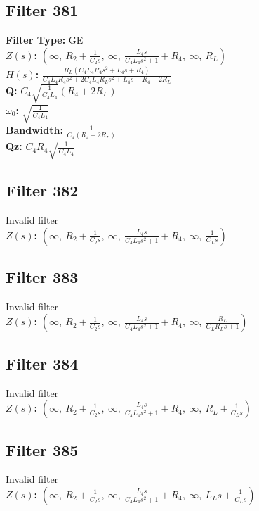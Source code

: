 \documentclass{article}
\begin{document}
\subsection*{Filter 381}
\textbf{Filter Type:} GE \\ 
\textbf{$Z(s)$:} $\left( \infty, \  R_{2} + \frac{1}{C_{2} s}, \  \infty, \  \frac{L_{4} s}{C_{4} L_{4} s^{2} + 1} + R_{4}, \  \infty, \  R_{L}\right)$ \\ 
\textbf{$H(s)$:} $\frac{R_{L} \left(C_{4} L_{4} R_{4} s^{2} + L_{4} s + R_{4}\right)}{C_{4} L_{4} R_{4} s^{2} + 2 C_{4} L_{4} R_{L} s^{2} + L_{4} s + R_{4} + 2 R_{L}}$ \\ 
\textbf{Q:} $C_{4} \sqrt{\frac{1}{C_{4} L_{4}}} \left(R_{4} + 2 R_{L}\right)$ \\ 
\textbf{$\omega_0$:} $\sqrt{\frac{1}{C_{4} L_{4}}}$ \\ 
\textbf{Bandwidth:} $\frac{1}{C_{4} \left(R_{4} + 2 R_{L}\right)}$ \\ 
\textbf{Qz:} $C_{4} R_{4} \sqrt{\frac{1}{C_{4} L_{4}}}$ \\ 
\subsection*{Filter 382}
Invalid filter \\ 
\textbf{$Z(s)$:} $\left( \infty, \  R_{2} + \frac{1}{C_{2} s}, \  \infty, \  \frac{L_{4} s}{C_{4} L_{4} s^{2} + 1} + R_{4}, \  \infty, \  \frac{1}{C_{L} s}\right)$ \\ 
\subsection*{Filter 383}
Invalid filter \\ 
\textbf{$Z(s)$:} $\left( \infty, \  R_{2} + \frac{1}{C_{2} s}, \  \infty, \  \frac{L_{4} s}{C_{4} L_{4} s^{2} + 1} + R_{4}, \  \infty, \  \frac{R_{L}}{C_{L} R_{L} s + 1}\right)$ \\ 
\subsection*{Filter 384}
Invalid filter \\ 
\textbf{$Z(s)$:} $\left( \infty, \  R_{2} + \frac{1}{C_{2} s}, \  \infty, \  \frac{L_{4} s}{C_{4} L_{4} s^{2} + 1} + R_{4}, \  \infty, \  R_{L} + \frac{1}{C_{L} s}\right)$ \\ 
\subsection*{Filter 385}
Invalid filter \\ 
\textbf{$Z(s)$:} $\left( \infty, \  R_{2} + \frac{1}{C_{2} s}, \  \infty, \  \frac{L_{4} s}{C_{4} L_{4} s^{2} + 1} + R_{4}, \  \infty, \  L_{L} s + \frac{1}{C_{L} s}\right)$ \\ 
\end{document}
